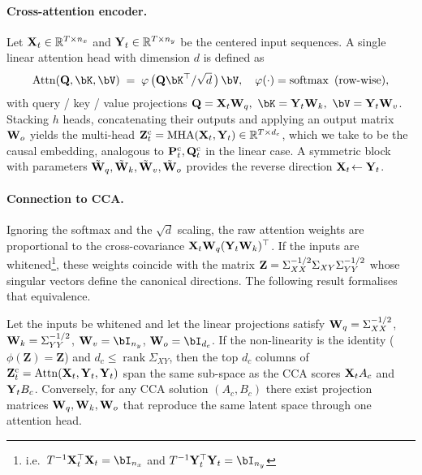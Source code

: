\documentclass[14pt]{extarticle}
\begin{document}
	\paragraph{Cross-attention encoder.}
	Let \(\mathbf{X}_t\in\mathbb{R}^{T\times n_x}\) and \(\mathbf{Y}_t\in\mathbb{R}^{T\times n_y}\) be the
	centered input sequences.
	A single linear attention head with dimension \(d\) is defined as
	\[
	\operatorname{Attn}(\bQ,\bK,\bV)\;=\;
	\phi \, \bigl( \bQ\bK^\top/\sqrt{d}\,\bigr)\,\bV,
	\quad
	\phi(\cdot)=\operatorname{softmax}\text{ (row-wise)},
	\]
	with query / key / value projections
	\(\bQ=\bX_t\bW_q,\ \bK=\bY_t\bW_k,\ \bV=\bY_t\bW_v\).
	Stacking \(h\) heads, concatenating their outputs and applying an
	output matrix \(\mathbf{W}_o\) yields the multi-head
	\(\mathbf{Z}_t^{\mathrm c}= \operatorname{MHA}(\mathbf{X}_t,\mathbf{Y}_t)\in\mathbb{R}^{T\times d_c}\),
	which we take to be the causal embedding, analogous to
	\(\mathbf{P}_t^{\mathrm c},\mathbf{Q}_t^{\mathrm c}\) in the linear case.
	A symmetric block with parameters
	\(\tilde{\mathbf{W}}_q,\tilde{\mathbf{W}}_k,\tilde{\mathbf{W}}_v,\tilde{\mathbf{W}}_o\) provides the
	reverse direction \(\mathbf{X}_t\!\leftarrow\mathbf{Y}_t\).
	
	\paragraph{Connection to CCA.}
	Ignoring the softmax and the \(\sqrt{d}\) scaling, the raw attention
	weights are proportional to the cross-covariance
	\(\mathbf{X}_t\mathbf{W}_q(\mathbf{Y}_t\mathbf{W}_k)^\top\).
	If the inputs are whitened\footnote{%
		i.e.\ \(T^{-1}\bX_t^\top\bX_t=\bI_{n_x}\) and
		\(T^{-1}\bY_t^\top\bY_t=\bI_{n_y}\)},
	these weights coincide with the matrix
	\(\mathbf{Z} = \Sigma_{XX}^{-1/2}\Sigma_{XY}\Sigma_{YY}^{-1/2}\)
	whose singular vectors define the canonical directions.
	The following result formalises that equivalence.
	
	\begin{theorem}
		\label{thm:attn_cca}
		Let the inputs be whitened and let the linear projections satisfy
		\(\mathbf{W}_q=\Sigma_{XX}^{-1/2}\),
		\(\mathbf{W}_k=\Sigma_{YY}^{-1/2}\),
		\(\bW_v=\bI_{n_y}\),
		\(\bW_o=\bI_{d_c}\).
		If the non-linearity is the identity
		(\(\phi(\mathbf Z)=\mathbf Z\)) and \(d_c\le\operatorname{rank}\Sigma_{XY}\),
		then the top \(d_c\) columns of
		\(\mathbf{Z}_t^{\mathrm c} = \operatorname{Attn}(\mathbf{X}_t,\mathbf{Y}_t,\mathbf{Y}_t)\)
		span the same sub-space as the CCA scores
		\(\mathbf{X}_tA_c\) and \(\mathbf{Y}_tB_c\).
		Conversely, for any CCA solution \((A_c,B_c)\) there exist projection
		matrices \(\mathbf{W}_q,\mathbf{W}_k,\mathbf{W}_o\) that reproduce the same latent space
		through one attention head.
	\end{theorem}
	
\end{document}
